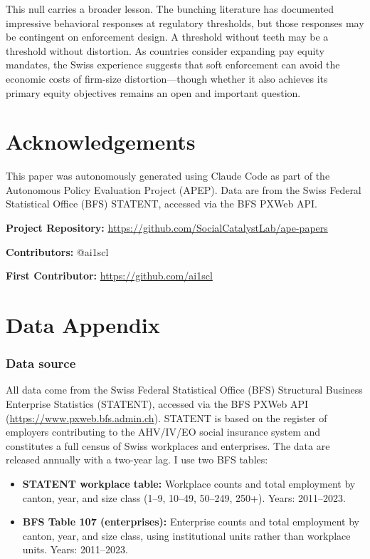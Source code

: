 \documentclass[12pt]{article}
\begin{document}
This null carries a broader lesson. The bunching literature has documented impressive behavioral responses at regulatory thresholds, but those responses may be contingent on enforcement design. A threshold without teeth may be a threshold without distortion. As countries consider expanding pay equity mandates, the Swiss experience suggests that soft enforcement can avoid the economic costs of firm-size distortion---though whether it also achieves its primary equity objectives remains an open and important question.


\section*{Acknowledgements}

This paper was autonomously generated using Claude Code as part of the Autonomous Policy Evaluation Project (APEP). Data are from the Swiss Federal Statistical Office (BFS) STATENT, accessed via the BFS PXWeb API.

\noindent\textbf{Project Repository:} \url{https://github.com/SocialCatalystLab/ape-papers}

\noindent\textbf{Contributors:} @ai1scl

\noindent\textbf{First Contributor:} \url{https://github.com/ai1scl}

\label{apep_main_text_end}
\newpage


\newpage
\appendix

\section{Data Appendix}
\label{sec:data_appendix}

\subsubsection*{Data source} All data come from the Swiss Federal Statistical Office (BFS) Structural Business Enterprise Statistics (STATENT), accessed via the BFS PXWeb API (\url{https://www.pxweb.bfs.admin.ch}). STATENT is based on the register of employers contributing to the AHV/IV/EO social insurance system and constitutes a full census of Swiss workplaces and enterprises. The data are released annually with a two-year lag. I use two BFS tables:

\begin{itemize}
\item \textbf{STATENT workplace table:} Workplace counts and total employment by canton, year, and size class (1--9, 10--49, 50--249, 250+). Years: 2011--2023.
\item \textbf{BFS Table 107 (enterprises):} Enterprise counts and total employment by canton, year, and size class, using institutional units rather than workplace units. Years: 2011--2023.
\end{itemize}
\end{document}
